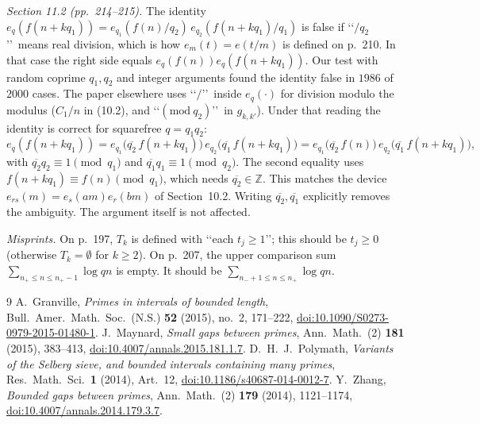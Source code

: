 \documentclass[11pt,a4paper]{amsart}
\theoremstyle{remark}
\begin{document}
\emph{Section 11.2 (pp.~214--215).} The identity
$e_q(f(n+kq_1))=e_{q_1}(f(n)/q_2)\,e_{q_2}(f(n+kq_1)/q_1)$ is false if \lq\lq$/q_2$\rq\rq\ means real
division, which is how $e_m(t)=e(t/m)$ is defined on p.~210. In that case the right side equals
$e_q(f(n))e_q(f(n+kq_1))$. Our test with random coprime $q_1,q_2$ and integer arguments found the
identity false in $1986$ of $2000$ cases. The paper elsewhere uses \lq\lq$/$\rq\rq\ inside $e_q(\cdot)$
for division modulo the modulus ($C_1/n$ in (10.2), and \lq\lq$(\mathrm{mod}\ q_2)$\rq\rq\ in $g_{k,k'}$). Under
that reading the identity is correct for squarefree $q=q_1q_2$:
\[
e_q(f(n+kq_1))=e_{q_1}\bigl(\overline{q_2}\,f(n+kq_1)\bigr)\,e_{q_2}\bigl(\overline{q_1}\,f(n+kq_1)\bigr)
=e_{q_1}\bigl(\overline{q_2}\,f(n)\bigr)\,e_{q_2}\bigl(\overline{q_1}\,f(n+kq_1)\bigr),
\]
with $\overline{q_2}q_2\equiv1\pmod{q_1}$ and $\overline{q_1}q_1\equiv1\pmod{q_2}$. The second
equality uses $f(n+kq_1)\equiv f(n)\pmod{q_1}$, which needs $\overline{q_2}\in\mathbb Z$. This
matches the device $e_{rs}(m)=e_s(am)e_r(bm)$ of Section~10.2. Writing $\overline{q_2},\overline{q_1}$
explicitly removes the ambiguity. The argument itself is not affected.

\emph{Misprints.} On p.~197, $T_k$ is defined with \lq\lq each $t_j\ge1$\rq\rq; this should be $t_j\ge0$
(otherwise $T_k=\emptyset$ for $k\ge2$). On p.~207, the upper comparison sum
$\sum_{n_+\le n\le n_+-1}\log qn$ is empty. It should be $\sum_{n_-+1\le n\le n_+}\log qn$.

\begin{thebibliography}{9}
 A.~Granville, \emph{Primes in intervals of bounded length}, Bull.\ Amer.\ Math.\ Soc.\
(N.S.) \textbf{52} (2015), no.~2, 171--222, \href{https://doi.org/10.1090/S0273-0979-2015-01480-1}{doi:10.1090/S0273-0979-2015-01480-1}.
\bibitem{M} J.~Maynard, \emph{Small gaps between primes}, Ann.\ Math.\ (2) \textbf{181} (2015),
383--413, \href{https://doi.org/10.4007/annals.2015.181.1.7}{doi:10.4007/annals.2015.181.1.7}.
\bibitem{P} D.~H.~J.~Polymath, \emph{Variants of the Selberg sieve, and bounded intervals containing many
primes}, Res.\ Math.\ Sci.\ \textbf{1} (2014), Art.~12, \href{https://doi.org/10.1186/s40687-014-0012-7}{doi:10.1186/s40687-014-0012-7}.
\bibitem{Z} Y.~Zhang, \emph{Bounded gaps between primes}, Ann.\ Math.\ (2) \textbf{179} (2014),
1121--1174, \href{https://doi.org/10.4007/annals.2014.179.3.7}{doi:10.4007/annals.2014.179.3.7}.
\end{thebibliography}
\end{document}
